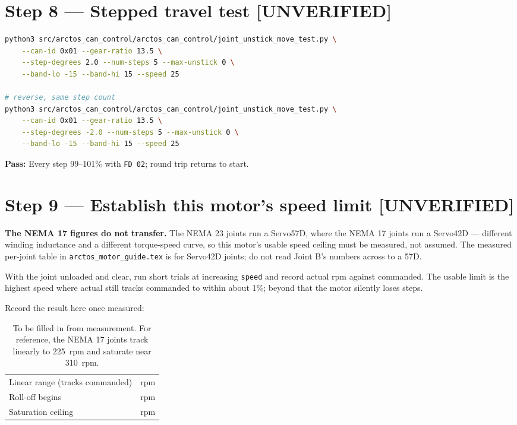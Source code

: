 \documentclass[11pt,letterpaper]{article}
\newcommand{\unverified}{{\color{unverifiedorange}\textbf{[UNVERIFIED]}}}
\newcommand{\passif}[1]{\par\vspace{2pt}\noindent\textbf{\color{okgreen}Pass:} #1\par\vspace{4pt}}
\begin{document}
\section*{Step 8 --- Stepped travel test \unverified}
\begin{lstlisting}[language=bash]
python3 src/arctos_can_control/arctos_can_control/joint_unstick_move_test.py \
    --can-id 0x01 --gear-ratio 13.5 \
    --step-degrees 2.0 --num-steps 5 --max-unstick 0 \
    --band-lo -15 --band-hi 15 --speed 25

# reverse, same step count
python3 src/arctos_can_control/arctos_can_control/joint_unstick_move_test.py \
    --can-id 0x01 --gear-ratio 13.5 \
    --step-degrees -2.0 --num-steps 5 --max-unstick 0 \
    --band-lo -15 --band-hi 15 --speed 25
\end{lstlisting}
\passif{Every step 99--101\% with \texttt{FD 02}; round trip returns to start.}

\section*{Step 9 --- Establish this motor's speed limit \unverified}
\textbf{The NEMA 17 figures do not transfer.} The NEMA 23 joints run a Servo57D,
where the NEMA 17 joints run a Servo42D --- different winding inductance and a
different torque-speed curve, so this motor's usable speed ceiling must be
measured, not assumed. The measured per-joint table in
\texttt{arctos\_motor\_guide.tex} is for Servo42D joints; do not read Joint B's
numbers across to a 57D.

With the joint unloaded and clear, run short trials at increasing \texttt{speed} and
record actual rpm against commanded. The usable limit is the highest speed where
actual still tracks commanded to within about 1\%; beyond that the motor silently
loses steps.

Record the result here once measured:

\begin{table}[h]
\centering
\begin{tabular}{ll}
\toprule
Linear range (tracks commanded) & \underline{\hspace{3cm}} rpm \\
Roll-off begins                 & \underline{\hspace{3cm}} rpm \\
Saturation ceiling              & \underline{\hspace{3cm}} rpm \\
\bottomrule
\end{tabular}
\caption{To be filled in from measurement. For reference, the NEMA 17 joints track
linearly to 225~rpm and saturate near 310~rpm.}
\end{table}
\end{document}

